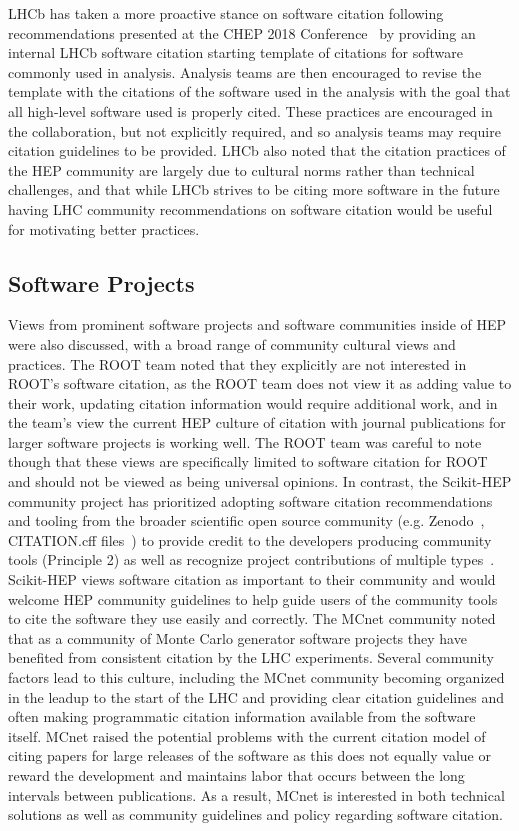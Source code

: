 LHCb has taken a more proactive stance on software citation following recommendations presented at the CHEP 2018 Conference~\cite{CHEP-2018-recommendations} by providing an internal LHCb software citation starting template of citations for software commonly used in analysis.
Analysis teams are then encouraged to revise the template with the citations of the software used in the analysis with the goal that all high-level software used is properly cited.
These practices are encouraged in the collaboration, but not explicitly required, and so analysis teams may require citation guidelines to be provided.
LHCb also noted that the citation practices of the HEP community are largely due to cultural norms rather than technical challenges, and that while LHCb strives to be citing more software in the future having LHC community recommendations on software citation would be useful for motivating better practices.

\subsection{Software Projects}\label{sec:software_projects}

Views from prominent software projects and software communities inside of HEP were also discussed, with a broad range of community cultural views and practices.
The ROOT team noted that they explicitly are not interested in ROOT's software citation, as the ROOT team does not view it as adding value to their work, updating citation information would require additional work, and in the team's view the current HEP culture of citation with journal publications for larger software projects is working well.
The ROOT team was careful to note though that these views are specifically limited to software citation for ROOT~\cite{Brun:1997pa} and should not be viewed as being universal opinions.
In contrast, the Scikit-HEP community project has prioritized adopting software citation recommendations and tooling from the broader scientific open source community (e.g. Zenodo~\cite{zenodo}, CITATION.cff files~\cite{Druskat_Citation_File_Format_2021}) to provide credit to the developers producing community tools (Principle 2) as well as recognize project contributions of multiple types~\cite{all-contributors}.
Scikit-HEP views software citation as important to their community and would welcome HEP community guidelines to help guide users of the community tools to cite the software they use easily and correctly.
The MCnet community noted that as a community of Monte Carlo generator software projects they have benefited from consistent citation by the LHC experiments.
Several community factors lead to this culture, including the MCnet community becoming organized in the leadup to the start of the LHC and providing clear citation guidelines and often making programmatic citation information available from the software itself.
MCnet raised the potential problems with the current citation model of citing papers for large releases of the software as this does not equally value or reward the development and maintains labor that occurs between the long intervals between publications.
As a result, MCnet is interested in both technical solutions as well as community guidelines and policy regarding software citation.


